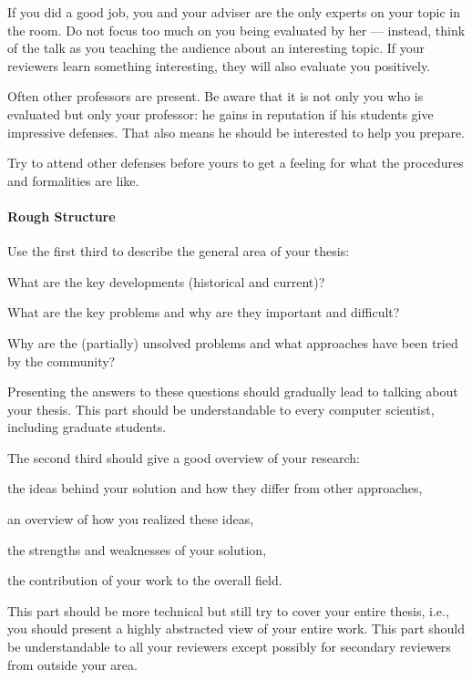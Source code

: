 \documentclass[12pt]{article}
\begin{document}
If you did a good job, you and your adviser are the only experts on your topic in the room.
Do not focus too much on you being evaluated by her --- instead, think of the talk as you teaching the audience about an interesting topic.
If your reviewers learn something interesting, they will also evaluate you positively. 
\medskip

Often other professors are present.
Be aware that it is not only you who is evaluated but only your professor: he gains in reputation if his students give impressive defenses.
That also means he should be interested to help you prepare. 
\medskip

Try to attend other defenses before yours to get a feeling for what the procedures and formalities are like.

\paragraph{Rough Structure}
Use the first third to describe the general area of your thesis:
\begin{compactitem}
 \item What are the key developments (historical and current)?
 \item What are the key problems and why are they important and difficult?
 \item Why are the (partially) unsolved problems and what approaches have been tried by the community?
\end{compactitem}
Presenting the answers to these questions should gradually lead to talking about your thesis.
This part should be understandable to every computer scientist, including graduate students.
\medskip

The second third should give a good overview of your research:
\begin{compactitem}
 \item the ideas behind your solution and how they differ from other approaches,
 \item an overview of how you realized these ideas,
 \item the strengths and weaknesses of your solution,
 \item the contribution of your work to the overall field.
\end{compactitem}
This part should be more technical but still try to cover your entire thesis, i.e., you should present a highly abstracted view of your entire work.
This part should be understandable to all your reviewers except possibly for secondary reviewers from outside your area.
\medskip
\end{document}
